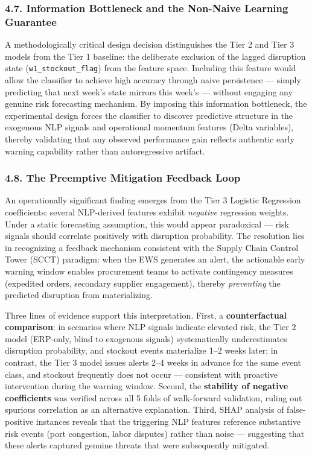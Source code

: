 \documentclass[conference]{IEEEtran}
\begin{document}
\subsubsection{4.7. Information Bottleneck and the Non-Naive Learning
Guarantee}\label{information-bottleneck-and-the-non-naive-learning-guarantee}

A methodologically critical design decision distinguishes the Tier 2 and
Tier 3 models from the Tier 1 baseline: the deliberate exclusion of the
lagged disruption state (\texttt{w1\_stockout\_flag}) from the feature
space. Including this feature would allow the classifier to achieve high
accuracy through naive persistence --- simply predicting that next
week's state mirrors this week's --- without engaging any genuine risk
forecasting mechanism. By imposing this information bottleneck, the
experimental design forces the classifier to discover predictive
structure in the exogenous NLP signals and operational momentum features
(Delta variables), thereby validating that any observed performance gain
reflects authentic early warning capability rather than autoregressive
artifact.

\subsubsection{4.8. The Preemptive Mitigation Feedback
Loop}\label{the-preemptive-mitigation-feedback-loop}

An operationally significant finding emerges from the Tier 3 Logistic
Regression coefficients: several NLP-derived features exhibit
\emph{negative} regression weights. Under a static forecasting
assumption, this would appear paradoxical --- risk signals should
correlate positively with disruption probability. The resolution lies in
recognizing a feedback mechanism consistent with the Supply Chain
Control Tower (SCCT) paradigm: when the EWS generates an alert, the
actionable early warning window enables procurement teams to activate
contingency measures (expedited orders, secondary supplier engagement),
thereby \emph{preventing} the predicted disruption from materializing.

Three lines of evidence support this interpretation. First, a
\textbf{counterfactual comparison}: in scenarios where NLP signals
indicate elevated risk, the Tier 2 model (ERP-only, blind to exogenous
signals) systematically underestimates disruption probability, and
stockout events materialize 1--2 weeks later; in contrast, the Tier 3
model issues alerts 2--4 weeks in advance for the same event class, and
stockout frequently does not occur --- consistent with proactive
intervention during the warning window. Second, the \textbf{stability of
negative coefficients} was verified across all 5 folds of walk-forward
validation, ruling out spurious correlation as an alternative
explanation. Third, SHAP analysis of false-positive instances reveals
that the triggering NLP features reference substantive risk events (port
congestion, labor disputes) rather than noise --- suggesting that these
alerts captured genuine threats that were subsequently mitigated.
\end{document}
